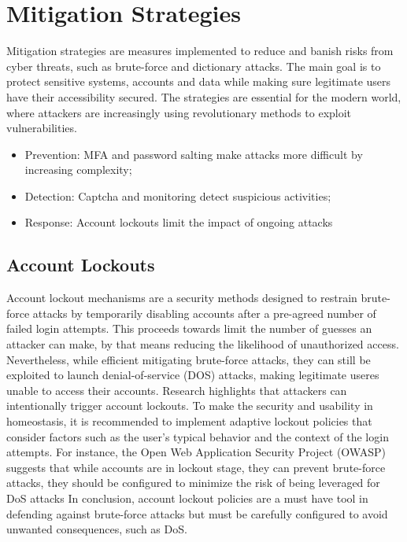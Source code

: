 \documentclass{comjnl}
\begin{document}
\section{Mitigation Strategies}
Mitigation strategies are measures implemented to reduce and banish risks from cyber threats, such as brute-force and dictionary attacks. The main goal is to protect sensitive systems, accounts and data while making sure legitimate users have their accessibility secured. The strategies are essential for the modern world, where attackers are increasingly using revolutionary methods to exploit vulnerabilities.


\begin{itemize}
  \item Prevention: MFA and password salting make attacks more difficult by increasing complexity;
  \item Detection: Captcha and monitoring detect suspicious activities;
  \item Response: Account lockouts limit the impact of ongoing attacks
\end{itemize}

\subsection{Account Lockouts}
Account lockout mechanisms are a security methods designed to restrain brute-force attacks by temporarily disabling accounts after a pre-agreed number of failed login attempts. This proceeds towards limit the number of guesses an attacker can make, by that means reducing the likelihood of unauthorized access. Nevertheless, while efficient mitigating brute-force attacks, they can still be exploited to launch denial-of-service (DOS) attacks, making legitimate useres unable to access their accounts. Research highlights that attackers can intentionally trigger account lockouts.\cite{account_lockout_dos} To make the security and usability in homeostasis, it is recommended to implement adaptive lockout policies that consider factors such as the user's typical behavior and the context of the login attempts. For instance, the Open Web Application Security Project (OWASP) suggests that while accounts are in lockout stage, they can prevent brute-force attacks, they should be configured to minimize the risk of being leveraged for DoS attacks \cite{blocking_brute_force} In conclusion, account lockout policies are a must have tool in defending against brute-force attacks but must be carefully configured to avoid unwanted consequences, such as DoS.
\end{document}
